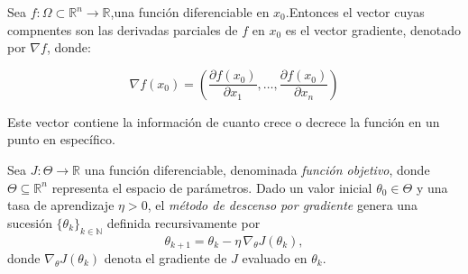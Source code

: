 \begin{definition}[Gradiente]
    Sea $f: \Omega \subset \mathbb{R}^n \longrightarrow \mathbb{R}$,una función diferenciable en $x_0$.Entonces el vector cuyas compnentes son las derivadas parciales de $f$ en $x_0$ es el vector gradiente, denotado por $\nabla f$, donde:

    \[\nabla f(x_0) = \left( \frac{\partial f(x_0)}{\partial x_1},\dotsc , \frac{\partial f(x_0)}{\partial x_n} \right)\]
\end{definition}
Este vector contiene la información de cuanto crece o decrece la función en un punto en específico.

\begin{definition}
    Sea $J : \Theta \to \mathbb{R}$ una función diferenciable, denominada \textit{función objetivo}, donde $\Theta \subseteq \mathbb{R}^n$ representa el espacio de parámetros.
    Dado un valor inicial $\theta_0 \in \Theta$ y una tasa de aprendizaje $\eta > 0$, el \textit{método de descenso por gradiente} genera una sucesión
    $\{ \theta_k \}_{k \in \mathbb{N}}$ definida recursivamente por
    \[
        \theta_{k+1} = \theta_k - \eta \, \nabla_\theta J(\theta_k),
    \]
    donde $\nabla_\theta J(\theta_k)$ denota el gradiente de $J$ evaluado en $\theta_k$.
\end{definition}

